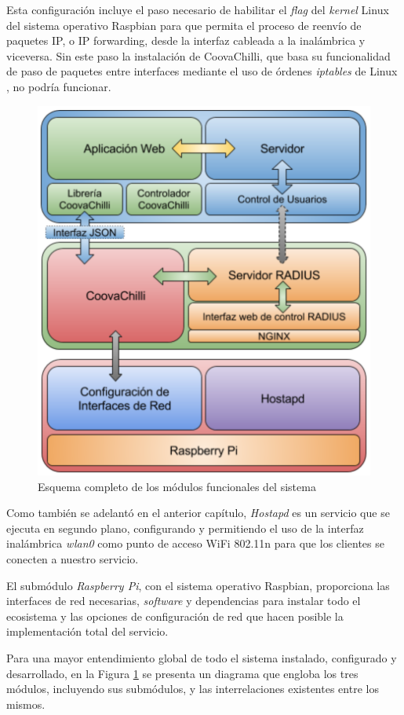 Esta configuración incluye el paso necesario de habilitar el \emph{flag} del \emph{kernel} Linux del sistema operativo Raspbian para que permita el proceso de reenvío de paquetes IP, o IP forwarding, desde la interfaz cableada a la inalámbrica y viceversa. Sin este paso la instalación de CoovaChilli, que basa su funcionalidad de paso de paquetes entre interfaces mediante el uso de órdenes \emph{iptables} de Linux \cite{TUNTAP2}, no podría funcionar.

\begin{figure}[!ht]
\begin{center}
\includegraphics[width=0.75\linewidth]{./4_AnalisisFuncional/Img/modulosTotal.png}
\end{center}
\caption{Esquema completo de los módulos funcionales del sistema}
\label{modulosTotal}
\end{figure}

Como también se adelantó en el anterior capítulo, \emph{Hostapd} es un servicio que se ejecuta en segundo plano, configurando y permitiendo el uso de la interfaz inalámbrica \emph{wlan0} como punto de acceso WiFi 802.11n para que los clientes se conecten a nuestro servicio.

El submódulo \emph{Raspberry Pi}, con el sistema operativo Raspbian, proporciona las interfaces de red necesarias, \emph{software} y dependencias para instalar todo el ecosistema y las opciones de configuración de red que hacen posible la implementación total del servicio.

Para una mayor entendimiento global de todo el sistema instalado, configurado y desarrollado, en la Figura \ref{modulosTotal} se presenta un diagrama que engloba los tres módulos, incluyendo sus submódulos, y las interrelaciones existentes entre los mismos.